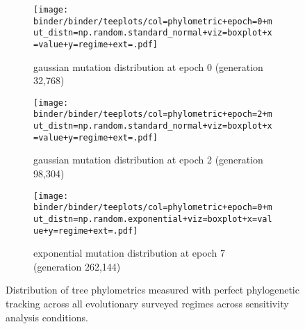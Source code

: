 \begin{figure*}
  \centering
  \begin{subfigure}[b]{\textwidth}
    \centering
    \texttt{[image: binder/binder/teeplots/col=phylometric+epoch=0+mut\_distn=np.random.standard\_normal+viz=boxplot+x=value+y=regime+ext=.pdf]}
    \caption{%
      gaussian mutation distribution at epoch 0 (generation 32,768)}
    \label{fig:perfect-tree-phylometrics-sensitivity-analysis:epoch0}
  \end{subfigure}
  \begin{subfigure}[b]{\textwidth}
    \centering
    \texttt{[image: binder/binder/teeplots/col=phylometric+epoch=2+mut\_distn=np.random.standard\_normal+viz=boxplot+x=value+y=regime+ext=.pdf]}
    \caption{%
      gaussian mutation distribution at epoch 2 (generation 98,304)}
    \label{fig:perfect-tree-phylometrics-sensitivity-analysis:epoch2}
  \end{subfigure}
  \begin{subfigure}[b]{\textwidth}
    \centering
    \texttt{[image: binder/binder/teeplots/col=phylometric+epoch=0+mut\_distn=np.random.exponential+viz=boxplot+x=value+y=regime+ext=.pdf]}
    \caption{%
      exponential mutation distribution at epoch 7 (generation 262,144)}
    \label{fig:perfect-tree-phylometrics-sensitivity-analysis:exponential}
  \end{subfigure}
  \caption{
    Distribution of tree phylometrics measured with perfect phylogenetic tracking across all evolutionary surveyed regimes across sensitivity analysis conditions.
  }
  \label{fig:perfect-tree-phylometrics-sensitivity-analysis}
\end{figure*}
